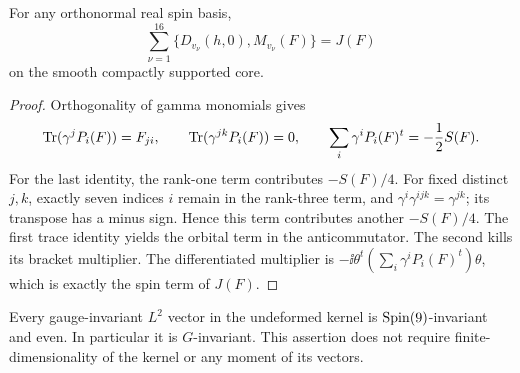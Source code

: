 \begin{lemma}
\label{alg:rotation-exact}
For any orthonormal real spin basis,
\begin{equation}
\label{alg:rotation-exact-eq}
 \sum_{\nu=1}^{16}\{D_{v_\nu}(h,0),M_{v_\nu}(F)\}=J(F)
\end{equation}
on the smooth compactly supported core.
\end{lemma}

\begin{proof}
Orthogonality of gamma monomials gives
\[
 \operatorname{Tr}(\gamma^jP_i(F))=F_{ji},\qquad
 \operatorname{Tr}(\gamma^{jk}P_i(F))=0,\qquad
 \sum_i\gamma^iP_i(F)^t=-\frac12S(F).
\]
For the last identity, the rank-one term contributes
\(-S(F)/4\). For fixed distinct \(j,k\), exactly seven indices
\(i\) remain in the rank-three term, and
\(\gamma^i\gamma^{ijk}=\gamma^{jk}\); its transpose has a minus
sign. Hence this term contributes another \(-S(F)/4\).
The first trace identity yields the orbital term in the
anticommutator. The second kills its bracket multiplier. The
differentiated multiplier is
\(-\ii\theta^t(\sum_i\gamma^iP_i(F)^t)\theta\), which is exactly
the spin term of \(J(F)\).
\end{proof}

\begin{proposition}
\label{prop:singlet-parity}
Every gauge-invariant \(L^2\) vector in the undeformed kernel is
\(\operatorname{Spin}(9)\)-invariant and even. In particular it is \(G\)-invariant.
This assertion does not require finite-dimensionality of the kernel
or any moment of its vectors.
\end{proposition}

